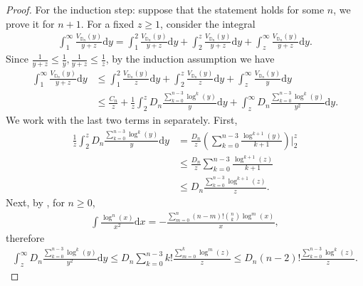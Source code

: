 \documentclass{amsart}
\newcommand{\DD}{\mathbb{D}}
\theoremstyle{definition}
\begin{document}
\begin{proof}
For the induction step: suppose that the statement holds for some $n$, we prove it for $n+1$. For a fixed $z\geqslant1$, consider the integral
\begin{equation}
\begin{split}
\int_1^\infty \frac{V_{\DD_n}(y)}{y+z} \mathrm{d}y 
= \int_1^{2} \frac{V_{\DD_n}(y)}{y+z} \mathrm{d}y+\int_{2}^z \frac{V_{\DD_n}(y)}{y+z} \mathrm{d}y+\int_z^\infty \frac{V_{\DD_n}(y)}{y+z} \mathrm{d}y.
\end{split}
\end{equation}
Since $\frac{1}{y+z}\leqslant \frac{1}{y}, \frac{1}{y+z}\leqslant \frac{1}{z}$, by the induction assumption we have 
\begin{equation}
\label{eq:int-3-terms}
\begin{split}
\int_1^\infty \frac{V_{\DD_n}(y)}{y+z} \mathrm{d}y  & 
\leqslant \int_1^{2} \frac{V_{\DD_n}(y)}{z} \mathrm{d}y+\int_{2}^z \frac{V_{\DD_n}(y)}{z} \mathrm{d}y+\int_z^\infty \frac{V_{\DD_n}(y)}{y} \mathrm{d}y
\\&
\leqslant \frac{C_n}{z} + \frac{1}{z}\int_{2}^z D_n \frac{\sum_{k=0}^{n-3}\log^k(y)}{y}\mathrm{d}y+ \int_z^\infty D_n\frac{\sum_{k=0}^{n-3}\log^k(y)}{y^2}\mathrm{d}y.
\end{split}
\end{equation}
We work with the last two terms in  separately. First,
\begin{equation}
\label{eq:int-mid-term-upper-bound}
\begin{split}
\frac{1}{z}\int_{2}^z D_n \frac{\sum_{k=0}^{n-3}\log^k(y)}{y}\mathrm{d}y & = \frac{D_n}{z} \left(\sum_{k=0}^{n-3}\frac{\log^{k+1}(y)}{k+1}\right)\Bigg|_{2}^z \\&\leqslant \frac{D_n}{z} \sum_{k=0}^{n-3}\frac{\log^{k+1}(z)}{k+1} \\&\leqslant D_n \frac{\sum_{k=0}^{n-3}\log^{k+1}(z)}{z}.
\end{split}
\end{equation}
Next, by \cite[Equation~2.722]{MR2360010}, for $n\geqslant0$,
\begin{align}
\int \frac{\log^n(x)}{x^2} \mathrm{d}x  =  -\frac{\sum_{m=0}^n (n-m)!{n \choose k}\log^{m}(x)} {x},
\end{align}
therefore
\begin{equation}
\label{eq:int-long-term-upper-bound}
\begin{split}
\int_z^\infty D_n\frac{\sum_{k=0}^{n-3}\log^k(y)}{y^2}\mathrm{d}y \leqslant  D_n \sum_{k=0}^{n-3} k!\frac{\sum_{m=0}^{k}\log^m(z)}{z} \leqslant D_n(n-2)!\frac{\sum_{k=0}^{n-3}\log^k(z)}{z}.

\end{split}
\end{equation}
\end{proof}
\end{document}
